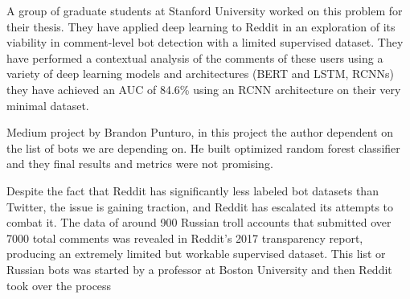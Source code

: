 \documentclass{article}
\begin{document}
     A group of graduate students at Stanford University worked on this problem for their thesis. They have applied deep learning to Reddit in an exploration of its viability in comment-level bot detection with a limited supervised dataset. They have performed a contextual analysis of the comments of these users using a variety of deep learning models and architectures (BERT and LSTM, RCNNs) they have achieved an AUC of 84.6\% using an RCNN architecture on their very minimal dataset.\par
     
     Medium project by Brandon Punturo, in this project the author dependent on the list of bots we are depending on. He built optimized random forest classifier and they final results and metrics were not promising.\par
     
     
     Despite the fact that Reddit has significantly less labeled bot datasets than Twitter, the issue is gaining traction, and Reddit has escalated its attempts to combat it. The data of around 900 Russian troll accounts that submitted over 7000 total comments was revealed in Reddit's 2017 transparency report, producing an extremely limited but workable supervised dataset. This list or Russian bots was started by a professor at Boston University and then Reddit took over the process \par
     
     

    
\end{document}
